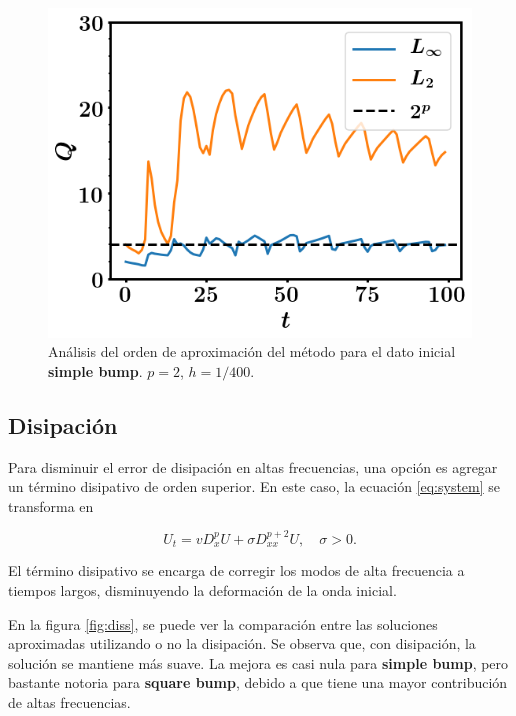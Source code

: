 \documentclass[12pt]{article}
\begin{document}
\begin{figure}
\center
\includegraphics[scale=0.5]{convergencia_tiempo.png}
\caption{An\'alisis del orden de aproximaci\'on del m\'etodo para el dato inicial \textbf{simple bump}. $p=2$, $h =1/400$.} \label{fig:convergencia}
\end{figure}

\subsection{Disipaci\'on}

Para disminuir el error de disipaci\'on en altas frecuencias, una opci\'on es agregar un t\'ermino disipativo de orden superior. En este caso, la ecuaci\'on \ref{eq:system} se transforma en 

\begin{equation}
U_t = v D_x^p U + \sigma D_{xx}^{p+2} U, \quad \sigma > 0.
\end{equation}

El t\'ermino disipativo se encarga de corregir los modos de alta frecuencia a tiempos largos, disminuyendo la deformaci\'on de la onda inicial. 

En la figura \ref{fig:diss}, se puede ver la comparaci\'on entre las soluciones aproximadas utilizando o no la disipaci\'on. Se observa que, con disipaci\'on, la soluci\'on se mantiene m\'as suave. La mejora es casi nula para \textbf{simple bump}, pero bastante notoria para \textbf{square bump}, debido a que tiene una mayor contribuci\'on de altas frecuencias.
\end{document}
